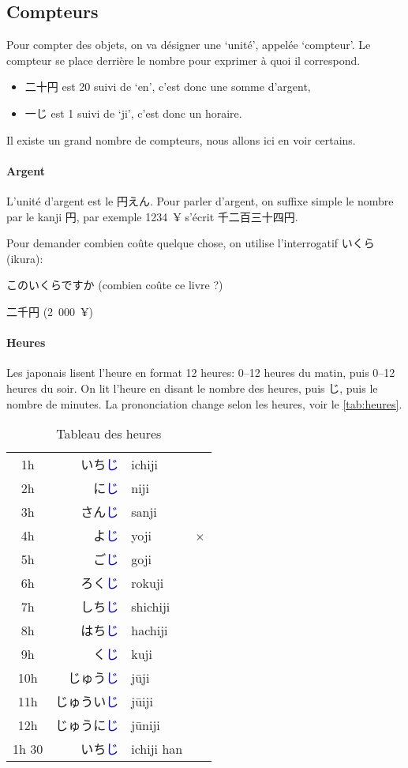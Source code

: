 \documentclass[a4paper,10pt,french,openany]{memoir}
\newcommand{\term}[1]{\textcolor{blue}{#1}}
\begin{document}
\subsection{Compteurs}\label{sec:compteurs}

Pour compter des objets, on va désigner une `unité', appelée `compteur'. Le compteur se place derrière le nombre pour exprimer à quoi il correspond.

\begin{itemize}
 \item 二十円 est 20 suivi de `en', c'est donc une somme d'argent,
 \item 一じ est 1 suivi de `ji', c'est donc un horaire.
\end{itemize}

Il existe un grand nombre de compteurs, nous allons ici en voir certains.

\paragraph{Argent}

L'unité d'argent est le \ruby 円{えん}. Pour parler d'argent, on suffixe simple le nombre par le kanji 円, par exemple 1234~¥ s'écrit 千二百三十四円.

Pour demander combien coûte quelque chose, on utilise l'interrogatif いくら (ikura):
\begin{cquote}{}
 このいくらですか (combien coûte ce livre ?)
  
 二千円 (2~000~¥)
\end{cquote}

\paragraph{Heures}

Les japonais lisent l'heure en format 12 heures: 0--12 heures du matin, puis 0--12 heures du soir. On lit l'heure en disant le nombre des heures, puis じ, puis le nombre de minutes. La prononciation change selon les heures, voir le \autoref{tab:heures}.

\begin{table}[htbp]
 \centering
 \caption{Tableau des heures}
 \label{tab:heures}
 \begin{tabular}{crll}
  1h & いち\term{じ} &ichiji\\
  2h & に\term{じ} &niji\\
  3h & さん\term{じ} &sanji\\
  4h & よ\term{じ} &yoji&×\\
  5h & ご\term{じ} &goji\\
  6h & ろく\term{じ} &rokuji\\
  7h & しち\term{じ} &shichiji\\
  8h & はち\term{じ} &hachiji\\
  9h & く\term{じ} &kuji\\
  10h& じゅう\term{じ} &jūji\\
  11h& じゅうい\term{じ}&jūiji\\
  12h& じゅうに\term{じ}&jūniji\\
  1h 30& いち\term{じ}&ichiji han
 \end{tabular}
\end{table}
\end{document}
